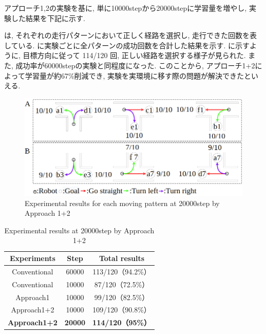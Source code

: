アプローチ1,2の実験を基に, 単に10000stepから20000stepに学習量を増やし, 実験した結果を下記に示す.

は, それぞれの走行パターンにおいて正しく経路を選択し, 走行できた回数を表している.  に実験ごとに全パターンの成功回数を合計した結果を示す.  に示すように, 目標方向に従って 114/120 回, 正しい経路を選択する様子が見られた. また, 成功率が60000stepの実験と同程度になった. このことから, アプローチ1+2によって学習量が約67\%削減でき, 実験を実環境に移す際の問題が解決できたといえる. 

\begin{figure}[hbtp]
  \centering
 \includegraphics[keepaspectratio, scale=0.42]
      {images/20000step_act1.5.png}
 \caption{Experimental results for each moving pattern at 20000step by Approach 1+2}
 \label{Fig:20000step_act1.5}
\end{figure} 

\begin{table}[hbtp]
  \caption{Experimental results at 20000step by Approach 1+2}
  \label{table:result5}
  \centering
  \begin{tabular}{|c|c|c|}
    \hline
    Experiments & Step & Total results\\
    \hline
    Conventional & 60000 & 113/120（94.2\%）\\
    \hline
    Conventional & 10000 & 87/120（72.5\%）\\
    \hline
    Approach1 & 10000 & 99/120（82.5\%）\\
    \hline
    Approach1+2 & 10000 & 109/120（90.8\%）\\
    \hline
    \textbf{Approach1+2} & \textbf{20000} & \textbf{114/120（95\%）}\\
    \hline
  \end{tabular}
\end{table}

\newpage
